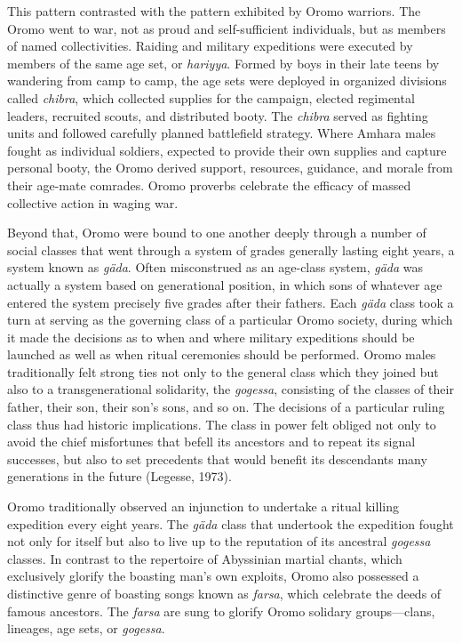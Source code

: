 This pattern contrasted with the pattern exhibited by Oromo warriors. The Oromo went to war, not as proud and self-sufficient individuals, but as members of named collectivities. Raiding and military expeditions were executed by members of the same age set, or \emph{hariyya}. Formed by boys in their late teens by wandering from camp to camp, the age sets were deployed in organized divisions called \emph{chibra}, which collected supplies for the campaign, elected regimental leaders, recruited scouts, and distributed booty. The \emph{chibra} served as fighting units and followed carefully planned battlefield strategy. Where Amhara males fought as individual soldiers, expected to provide their own supplies and capture personal booty, the Oromo derived support, resources, guidance, and morale from their age-mate comrades. Oromo proverbs celebrate the efficacy of massed collective action in waging war.

Beyond that, Oromo were bound to one another deeply through a number of social classes that went through a system of grades generally lasting eight years, a system known as \emph{g\"{a}da}. Often misconstrued as an age-class system, \emph{g\"{a}da} was actually a system based on generational position, in which sons of whatever age entered the system precisely five grades after their fathers. Each \emph{g\"{a}da} class took a turn at serving as the governing class of a particular Oromo society, during which it made the decisions as to when and where military expeditions should be launched as well as when ritual ceremonies should be performed. Oromo males traditionally felt strong ties not only to the general class which they joined but also to a transgenerational solidarity, the \emph{gogessa}, consisting of the classes of their father, their son, their son's sons, and so on. The decisions of a particular ruling class thus had historic implications. The class in power felt obliged not only to avoid the chief misfortunes that befell its ancestors and to repeat its signal successes, but also to set precedents that would benefit its descendants many generations in the future (Legesse, 1973).  

Oromo traditionally observed an injunction to undertake a ritual killing expedition every eight years. The \emph{g\"{a}da} class that undertook the expedition fought not only for itself but also to live up to the reputation of its ancestral \emph{gogessa} classes. In contrast to the repertoire of Abyssinian martial chants, which exclusively glorify the boasting man's own exploits, Oromo also possessed a distinctive genre of boasting songs known as \emph{farsa}, which celebrate the deeds of famous ancestors. The \emph{farsa} are sung to glorify Oromo solidary groups---clans, lineages, age sets, or \emph{gogessa}.

